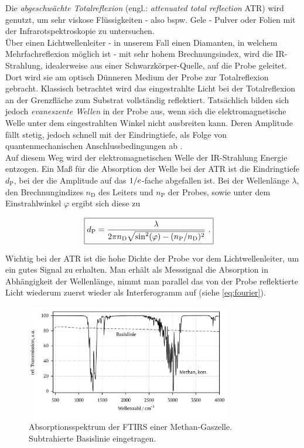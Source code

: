 \documentclass[a4paper,10pt,twocolumn]{article}
\newcommand{\ix}[1]{_\text{#1}}
\newcommand{\tilt}[1]{\textit{#1}}
\newcommand{\euler}{\mathnormal{e}}
\begin{document}
		Die \tilt{abgeschw\"achte Totalreflexion} (engl.: \tilt{attenuated total reflection} ATR) wird genutzt, um sehr viskose Fl\"ussigkeiten - also bspw. Gele - Pulver oder Folien mit der Infrarotspektroskopie zu untersuchen.\\
		\"Uber einen Lichtwellenleiter - in unserem Fall einen Diamanten, in welchem Mehrfachreflexion m\"oglich ist - mit sehr hohem Brechnungsindex, wird die IR-Strahlung, idealerweise aus einer Schwarzk\"orper-Quelle, auf die Probe geleitet. Dort wird sie am optisch D\"unneren Medium der Probe zur Totalreflexion gebracht. Klassisch betrachtet wird das eingestrahlte Licht bei der Totalreflexion an der Grenzfl\"ache zum Substrat vollst\"andig reflektiert. Tats\"achlich bilden sich jedoch \tilt{evaneszente Wellen} in der Probe aus, wenn sich die elektromagnetische Welle unter dem eingestrahlten Winkel nicht ausbreiten kann. Deren Amplitude f\"allt stetig, jedoch schnell mit der Eindringtiefe, als Folge von quantenmechanischen Anschlussbedingungen ab \cite{FTIRInfra}.\\
		Auf diesem Weg wird der elektromagnetischen Welle der IR-Strahlung Energie entzogen. Ein Ma{\ss} f\"ur die Absorption der Welle bei der ATR ist die Eindringtiefe $d\ix{P}$, bei der die Amplitude auf das  $1/\euler$-fache abgefallen ist. Bei der Wellenl\"ange $\lambda$, den Brechnungindizes $n\ix{D}$ des Leiters und $n\ix{P}$ der Probes, sowie unter dem Einstrahlwinkel $\varphi$ ergibt sich diese zu
		
		\begin{align}
		\Aboxed{
			d\ix{P}=\frac{\lambda}{2\pi n\ix{D}\sqrt{\sin^{2}(\varphi)-(n\ix{P}/n\ix{D})^{2}}}\,\, .
		} \label{eq:atr}
		\end{align}
		
		Wichtig bei der ATR ist die hohe Dichte der Probe vor dem Lichtwellenleiter, um ein gutes Signal zu erhalten. Man erh\"alt als Messsignal die Absorption in Abh\"angigkeit der Wellenl\"ange, nimmt man parallel das von der Probe reflektierte Licht wiederum zuerst wieder als Interferogramm auf (siehe \autoref{eq:fourier}).

			\begin{figure}
			\centering
				\includegraphics[width=0.8\textwidth]{Gruppe2A/methan.pdf}
				\caption{Absorptionsspektrum der FTIRS einer Methan-Gaszelle. Subtrahierte Basislinie eingetragen.}
				\label{img:methan}
			\end{figure}
\end{document}
